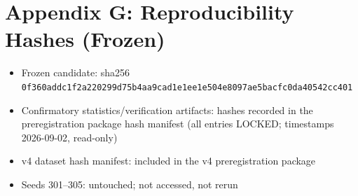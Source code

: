 \documentclass[journal]{IEEEtran}
\begin{document}
\section*{Appendix G: Reproducibility Hashes (Frozen)}

\begin{itemize}
\item Frozen candidate: sha256 \texttt{0f360add\-c1f2a220\-299d75b4\-aa9cad1e\-1ee1e504\-e8097ae5\-bacfc0da\-40542cc401}
\item Confirmatory statistics/verification artifacts: hashes recorded in the preregistration package hash manifest (all entries LOCKED; timestamps 2026-09-02, read-only)
\item v4 dataset hash manifest: included in the v4 preregistration package
\item Seeds 301--305: untouched; not accessed, not rerun
\end{itemize}
\end{document}
